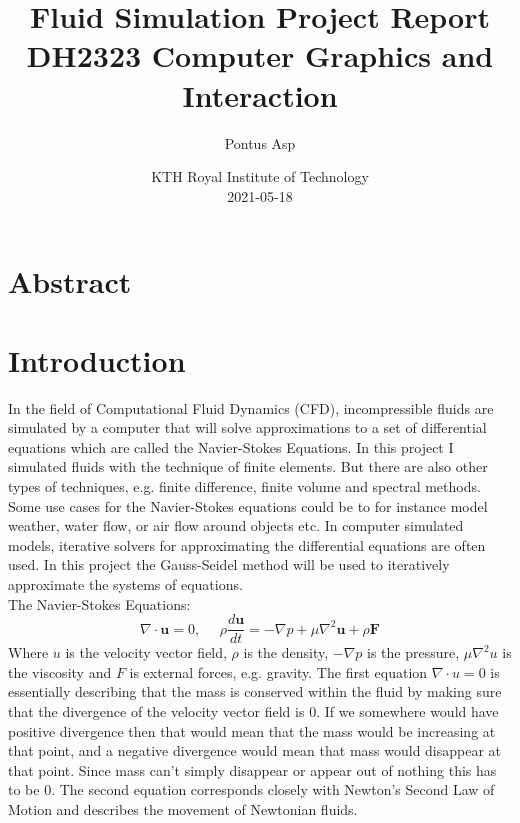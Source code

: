 \documentclass{article}
\title{%
\textbf{Fluid Simulation Project Report}\\%
\large DH2323 Computer Graphics and Interaction}
\author{Pontus Asp}
\date{%
KTH Royal Institute of Technology\\%
2021-05-18}
\begin{document}
\maketitle
\begin{multicols}{2}

\section{Abstract}
\section{Introduction}
In the field of Computational Fluid Dynamics (CFD), incompressible fluids are simulated by a computer that will solve approximations to a set of differential equations which are called the Navier-Stokes Equations. In this project I simulated fluids with the technique of finite elements. But there are also other types of techniques, e.g. finite difference, finite volume and spectral methods. Some use cases for the Navier-Stokes equations could be to for instance model weather, water flow, or air flow around objects etc. In computer simulated models, iterative solvers for approximating the differential equations are often used. In this project the Gauss-Seidel method will be used to iteratively approximate the systems of equations.\\
The Navier-Stokes Equations:
\[
    \nabla \cdot \bm{u}=0,~~~~~~
    \rho\frac{d\bm{u}}{dt}=-\nabla p+\mu\nabla^2\bm{u}+\rho \bm{F}
\]
Where $u$ is the velocity vector field, $\rho$ is the density, $-\nabla p$ is the pressure, $\mu \nabla^2u$ is the viscosity and $F$ is external forces, e.g. gravity. The first equation $\nabla \cdot u=0$ is essentially describing that the mass is conserved within the fluid by making sure that the divergence of the velocity vector field is $0$. If we somewhere would have positive divergence then that would mean that the mass would be increasing at that point, and a negative divergence would mean that mass would disappear at that point. Since mass can't simply disappear or appear out of nothing this has to be $0$. The second equation corresponds closely with Newton's Second Law of Motion and describes the movement of Newtonian fluids.


\end{multicols}
\end{document}

